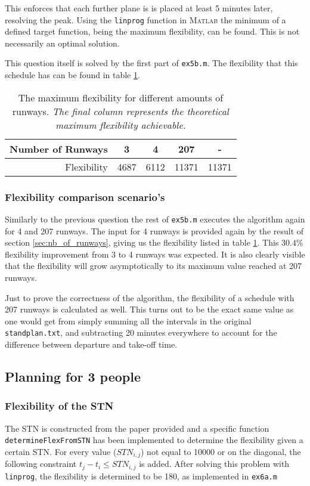 \documentclass[10pt,a4paper]{article}
\begin{document}
This enforces that each further plane is is placed at least 5 minutes later, resolving the peak. Using the \texttt{linprog} function in \textsc{Matlab} the minimum of a defined target function, being the maximum flexibility, can be found. This is not necessarily an optimal solution.

This question itself is solved by the first part of \texttt{ex5b.m}. The flexibility that this schedule has can be found in table \ref{table:flex}. 

\begin{table}
\centering
\begin{tabular}{ r || c | c | c | c}

Number of Runways & 3 & 4 & 207 & - \\ \hline
Flexibility & 4687 &  6112 & 11371 & 11371
\end{tabular}
\caption{The maximum flexibility for different amounts of runways. \emph{The final column represents the theoretical maximum flexibility achievable.}}
\label{table:flex}
\end{table}


\subsubsection{Flexibility comparison scenario's}
Similarly to the previous question the rest of \texttt{ex5b.m} executes the algorithm again for 4 and 207 runways. The input for 4 runways is provided again by the result of section \ref{sec:nb_of_runways}, giving us the flexibility listed in table \ref{table:flex}. This $30.4\%$ flexibility improvement from 3 to 4 runways was expected. It is also clearly visible that the flexibility will grow asymptotically to its maximum value reached at 207 runways.

Just to prove the correctness of the algorithm, the flexibility of a schedule with 207 runways is calculated as well. This turns out to be the exact same value as one would get from simply summing all the intervals in the original \texttt{standplan.txt}, and subtracting 20 minutes everywhere to account for the difference between departure and take-off time.

\subsection{Planning for 3 people}
\subsubsection{Flexibility of the STN}
\label{sec:flex_boerkoel_1}
The STN is constructed from the paper provided and a specific function \texttt{de\-ter\-mine\-Flex\-From\-STN} has been implemented to determine the flexibility given a certain STN. For every value ($STN_{i,j}$) not equal to 10000 or on the diagonal, the following constraint $t_j - t_i \leq STN_{i,j}$ is added. After solving this problem with \texttt{linprog},  the flexibility is determined to be 180, as implemented in \texttt{ex6a.m}
\end{document}
